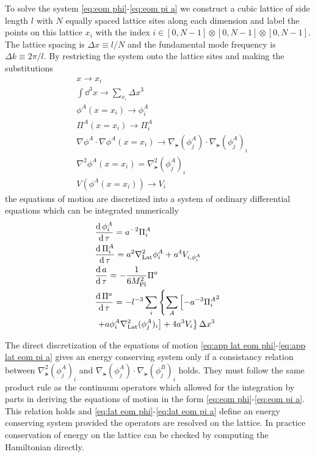 To solve the system \eqref{eq:eom phi}-\eqref{eq:eom pi a} we construct a cubic lattice of side length $l$ with $N$ equally spaced lattice sites along each dimension and label the points on this lattice $x_i$ with the index $i\in[0,N-1]\otimes[0,N-1]\otimes[0,N-1]$.
The lattice spacing is $\Delta x \equiv l/N$ and the fundamental mode frequency is $\Delta k \equiv 2\pi/l$.
By restricting the system onto the lattice sites and making the substitutions
\begin{align}
  & x \to x_i \label{eq:lat sub1}\\
  & \int\dd^3x \to \sum_{x_i}\Delta x^3 \\
  & \phi^A(x=x_i) \to \phi^A_i \\
  & \Pi^A(x=x_i) \to \Pi^A_i \\
  & \nabla\phi^A\cdot\nabla\phi^A(x=x_i) \to \nabla_\lat(\phi^A_j)\cdot\nabla_\lat(\phi^A_j)_i \\
  & \nabla^2\phi^A(x=x_i) = \nabla^2_\lat(\phi^A_j)_i \\
  & V(\phi^A(x=x_i)) \to V_i \label{eq:lat sub7}
\end{align}
the equations of motion are discretized into a system of ordinary differential equations which can be integrated numerically
\begin{align}
  & \frac{\mathrm{d}\,\phi^A_i}{\mathrm{d}\,\tau} = a^{-2}\Pi^A_i \label{eq:app lat eom phi} \\
  & \frac{\mathrm{d}\,\Pi^A_i}{\mathrm{d}\,\tau} = a^2\nabla^2_{\mathrm{Lat}}\phi^A_i + a^4V_{i,\phi^A_i} \\
  & \frac{\mathrm{d}\, a}{\mathrm{d}\,\tau} = -\frac{1}{6M_{\mathrm{Pl}}^2}\Pi^a \\
  & \frac{\mathrm{d}\,\Pi^a}{\mathrm{d}\,\tau} = -l^{-3}\sum_i\left\{
  \sum_A\left[-a^{-3}{\Pi^A_i}^2 \right. \right. \\
    & \left. \left. + a\phi^A_i\nabla^2_{\mathrm{Lat}}(\phi^A_j)_i \right] +4a^3V_i
  \right\}\Delta x^3 \label{eq:app lat eom pi a}
\end{align}

The direct discretization of the equations of motion \eqref{eq:app lat eom phi}-\eqref{eq:app lat eom pi a} gives an energy conserving system only if a consistancy relation between $\nabla^2_\lat(\phi^A_j)_i$ and $\nabla_\lat(\phi^A_j)\cdot\nabla_\lat(\phi^B_j)_i$ holds.
They must follow the same product rule as the continuum operators which allowed for the integration by parts in deriving the equations of motion in the form \eqref{eq:eom phi}-\eqref{eq:eom pi a}.
This relation holds and \eqref{eq:lat eom phi}-\eqref{eq:lat eom pi a} define an energy conserving system provided the operators are resolved on the lattice.
In practice conservation of energy on the lattice can be checked by computing the Hamiltonian directly.

